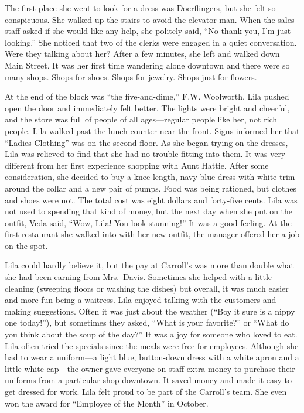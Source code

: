 \documentclass[
  letterpaper,
]{book}
\begin{document}
The first place she went to look for a dress was Doerflingers, but she
felt so conspicuous. She walked up the stairs to avoid the elevator man.
When the sales staff asked if she would like any help, she politely
said, ``No thank you, I'm just looking.'' She noticed that two of the
clerks were engaged in a quiet conversation. Were they talking about
her? After a few minutes, she left and walked down Main Street. It was
her first time wandering alone downtown and there were so many shops.
Shops for shoes. Shops for jewelry. Shops just for flowers.

At the end of the block was ``the five-and-dime,'' F.W. Woolworth. Lila
pushed open the door and immediately felt better. The lights were bright
and cheerful, and the store was full of people of all ages---regular
people like her, not rich people. Lila walked past the lunch counter
near the front. Signs informed her that ``Ladies Clothing'' was on the
second floor. As she began trying on the dresses, Lila was relieved to
find that she had no trouble fitting into them. It was very different
from her first experience shopping with Aunt Hattie. After some
consideration, she decided to buy a knee-length, navy blue dress with
white trim around the collar and a new pair of pumps. Food was being
rationed, but clothes and shoes were not. The total cost was eight
dollars and forty-five cents. Lila was not used to spending that kind of
money, but the next day when she put on the outfit, Veda said, ``Wow,
Lila! You look stunning!'' It was a good feeling. At the first
restaurant she walked into with her new outfit, the manager offered her
a job on the spot.

Lila could hardly believe it, but the pay at Carroll's was more than
double what she had been earning from Mrs.~Davis. Sometimes she helped
with a little cleaning (sweeping floors or washing the dishes) but
overall, it was much easier and more fun being a waitress. Lila enjoyed
talking with the customers and making suggestions. Often it was just
about the weather (``Boy it sure is a nippy one today!''), but sometimes
they asked, ``What is your favorite?'' or ``What do you think about the
soup of the day?'' It was a joy for someone who loved to eat. Lila often
tried the specials since the meals were free for employees. Although she
had to wear a uniform---a light blue, button-down dress with a white
apron and a little white cap---the owner gave everyone on staff extra
money to purchase their uniforms from a particular shop downtown. It
saved money and made it easy to get dressed for work. Lila felt proud to
be part of the Carroll's team. She even won the award for ``Employee of
the Month'' in October.
\end{document}
